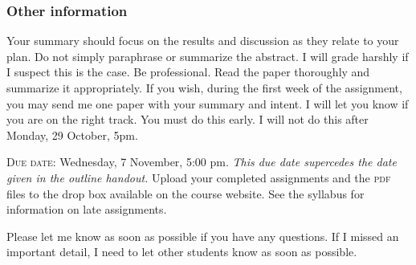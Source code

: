 \documentclass[12pt]{article}
\begin{document}
\subsubsection*{Other information}

Your summary should focus on the results and discussion as they relate to your plan. Do not simply paraphrase or summarize the abstract. I will grade harshly if I suspect this is the case. Be professional. Read the paper thoroughly and summarize it appropriately. If you wish, during the first week of the assignment, you may send me one paper with your summary and intent. I will let you know if you are on the right track. You must do this early. I will not do this after Monday, 29 October, 5pm.

\textsc{Due date:} Wednesday, 7 November, 5:00 pm. \emph{This due date supercedes the date given in the outline handout.} Upload your completed assignments and the \textsc{pdf} files to the drop box available on the course website. See the syllabus for information on late assignments.

\vspace*{\baselineskip}

Please let me know as soon as possible if you have any questions. If I missed an important detail, I need to let other students know as soon as possible.
\end{document}
